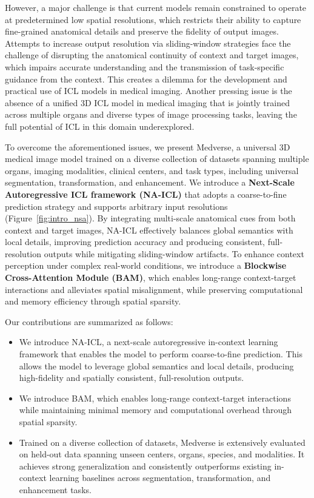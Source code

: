 However, a major challenge is that current models remain constrained to operate at predetermined low spatial resolutions, which restricts their ability to capture fine-grained anatomical details and preserve the fidelity of output images. Attempts to increase output resolution via sliding-window strategies face the challenge of disrupting the anatomical continuity of context and target images, which impairs accurate understanding and the transmission of task-specific guidance from the context. This creates a dilemma for the development and practical use of ICL models in medical imaging. Another pressing issue is the absence of a unified 3D ICL model in medical imaging that is jointly trained across multiple organs and diverse types of image processing tasks, leaving the full potential of ICL in this domain underexplored.

To overcome the aforementioned issues, we present Medverse, a universal 3D medical image model trained on a diverse collection of datasets spanning multiple organs, imaging modalities, clinical centers, and task types, including universal segmentation, transformation, and enhancement. We introduce a \textbf{Next-Scale Autoregressive ICL framework (NA-ICL)} that adopts a coarse-to-fine prediction strategy and supports arbitrary input resolutions (Figure~\ref{fig:intro_nsa}). By integrating multi-scale anatomical cues from both context and target images, NA-ICL effectively balances global semantics with local details, improving prediction accuracy and producing consistent, full-resolution outputs while mitigating sliding-window artifacts. To enhance context perception under complex real-world conditions, we introduce a \textbf{Blockwise Cross-Attention Module (BAM)}, which enables long-range context-target interactions and alleviates spatial misalignment, while preserving computational and memory efficiency through spatial sparsity.


Our contributions are summarized as follows:
\begin{itemize}
    \item We introduce NA-ICL, a next-scale autoregressive in-context learning framework that enables the model to perform coarse-to-ﬁne prediction. This allows the model to leverage global semantics and local details, producing high-fidelity and spatially consistent, full-resolution outputs.
    \item We introduce BAM, which enables long-range context-target interactions while maintaining minimal memory and computational overhead through spatial sparsity.
    \item Trained on a diverse collection of datasets, Medverse is extensively evaluated on held-out data spanning unseen centers, organs, species, and modalities. It achieves strong generalization and consistently outperforms existing in-context learning baselines across segmentation, transformation, and enhancement tasks.
\end{itemize}




